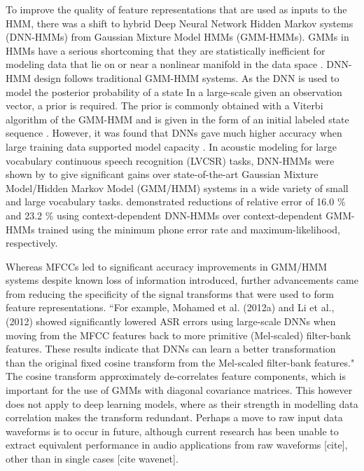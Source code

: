 \documentclass[12pt]{llncs}
\begin{document}
To improve the quality of feature representations that are used as inputs to the HMM, there was a shift to hybrid Deep Neural Network Hidden Markov systems (DNN-HMMs) from Gaussian Mixture Model HMMs (GMM-HMMs). GMMs in HMMs have a serious shortcoming that they are statistically inefficient for modeling data that lie on or near a nonlinear manifold in the data space \cite{hinton2012deep}.  DNN-HMM design follows traditional GMM-HMM systems. As the DNN is used to model the posterior probability of a state In a large-scale given an observation vector, a prior is required. The prior is commonly obtained with a Viterbi algorithm of the GMM-HMM and is given in the form of an initial labeled state sequence \cite{li2013hybrid}.  However, it was found that DNNs gave much higher accuracy when large training data supported model capacity \cite{deng2014achievements}.  In acoustic modeling for large vocabulary continuous speech recognition (LVCSR) tasks, DNN-HMMs were shown by \cite{dahl2012context}to give significant gains over state-of-the-art Gaussian Mixture Model/Hidden Markov Model (GMM/HMM) systems in a wide variety of small and large vocabulary tasks. \cite{dahl2012context}demonstrated reductions of relative error of 16.0 \% and 23.2 \% using context-dependent DNN-HMMs over context-dependent GMM-HMMs trained using the minimum phone error rate and maximum-likelihood, respectively.



Whereas MFCCs led to significant accuracy improvements in GMM/HMM systems despite known loss of information introduced, further advancements came from reducing the specificity of the signal transforms that were used to form feature representations.
``For example, Mohamed et al. (2012a) \cite[firstExampleMovingGMMsectionofHMM/GMMtoDNN]{mohamed2012acoustic} and Li et al., (2012) showed significantly lowered ASR errors using large-scale DNNs when moving from the MFCC features back to more primitive (Mel-scaled) filter-bank features. These results indicate that DNNs can learn a better transformation than the original fixed cosine transform from the Mel-scaled filter-bank features."  The cosine transform approximately de-correlates feature components, which is important for the use of GMMs with diagonal covariance matrices. This however does not apply to deep learning models, where as their strength in modelling data correlation makes the transform redundant. Perhaps a move to raw input data waveforms is to occur in future, although current research has been unable to extract equivalent performance in audio applications from raw waveforms [cite], other than in single cases [cite wavenet].
\end{document}
